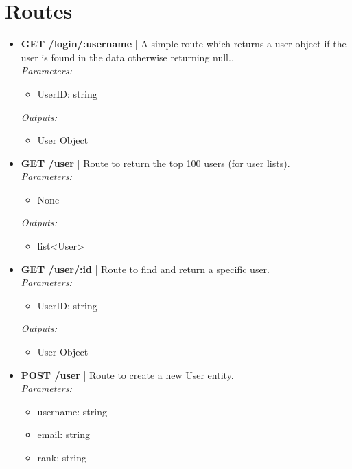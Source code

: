 \documentclass[11pt, conference,letterpaper]{IEEEtran}
\begin{document}
\section{Routes}
\begin{itemize}
    \item \textbf{GET /login/:username} | A simple route which returns a user object if the user is found in the data otherwise returning null..
        \\ \textit{Parameters: }
        \begin{itemize}
            \item UserID: string
        \end{itemize}
        \textit{Outputs: }
        \begin{itemize}
            \item User Object
        \end{itemize}
    \item \textbf{GET /user} | Route to return the top 100 users (for user lists).
        \\ \textit{Parameters: }
        \begin{itemize}
            \item None
        \end{itemize}
        \textit{Outputs: }
        \begin{itemize}
            \item list<User>
        \end{itemize}
    \item \textbf{GET /user/:id} | Route to find and return a specific user.
        \\ \textit{Parameters: }
        \begin{itemize}
            \item UserID: string
        \end{itemize}
        \textit{Outputs: }
        \begin{itemize}
            \item User Object
        \end{itemize}
    \item \textbf{POST /user} | Route to create a new User entity.
        \\ \textit{Parameters: }
        \begin{itemize}
            \item username: string
            \item email: string
            \item rank: string
        \end{itemize}

\end{itemize}
\end{document}
